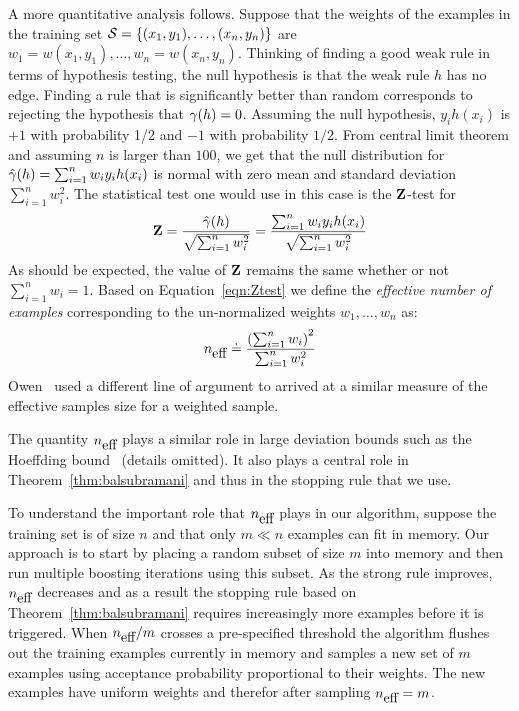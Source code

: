 A more quantitative analysis follows. Suppose that the weights of the
examples in the training set ${\cal S}=\{ (x_1, y_1), \ldots, (x_n,
y_n) \}$ are $w_1=w(x_1,y_1),\ldots,w_n=w(x_n,y_n)$. Thinking of
finding a good weak rule in terms of hypothesis testing, the null
hypothesis is that the weak rule $h$ has no edge. Finding a rule that
is significantly better than random corresponds to rejecting the
hypothesis that $\gamma(h)=0$.  Assuming the null hypothesis, $y_i
h(x_i)$ is $+1$ with probability 1/2 and $-1$ with probability
$1/2$. From central limit theorem and assuming $n$ is larger than
$100$, we get that the null distribution for $\hat{\gamma}(h)=\sum_{i=1}^n
w_i y_i h(x_i)$ is normal with zero mean and standard deviation
$\sum_{i=1}^n w_i^2$. The statistical test one would use in this case
is the ${\mathbf Z}$-test for
\begin{equation} \label{eqn:Ztest}
{\mathbf Z} = \frac{\hat{\gamma}(h)}{\sqrt{\sum_{i=1}^n w_i^2}}
= \frac{\sum_{i=1}^n w_i y_i h(x_i)}{\sqrt{\sum_{i=1}^n w_i^2}}
\end{equation}
As should be expected, the value of ${\mathbf Z}$ remains the same whether
or not $\sum_{i=1}^n w_i=1$. Based on Equation~\ref{eqn:Ztest} we
define the {\em effective number of examples} corresponding to the
un-normalized weights $w_1,\ldots,w_n$ as:
\begin{equation} \label{eqn:neff}
  {n_{\mbox{eff}}} \doteq \frac{\left(\sum_{i=1}^n w_i\right)^2}{\sum_{i=1}^n w_i^2}
\end{equation}
Owen~\cite{owen_monte_2013} used a different line of
argument to arrived at a similar measure of
the effective samples size for a weighted sample.

The quantity ${n_{\mbox{eff}}}$ plays a similar role in large deviation bounds
such as the Hoeffding bound~\cite{hoeffding_probability_1963} (details omitted).
It also plays
a central role in Theorem~\ref{thm:balsubramani} and thus in the
stopping rule that we use.

To understand the important role that ${n_{\mbox{eff}}}$ plays in our algorithm,
suppose the training set is of size $n$ and that only $m \ll n$
examples can fit in memory. Our approach is to start by placing a
random subset of size $m$ into memory and then run multiple
boosting iterations using this subset. As the strong rule improves,
${n_{\mbox{eff}}}$ decreases and as a result the stopping rule based on
Theorem~\ref{thm:balsubramani} requires increasingly more examples
before it is triggered. When ${n_{\mbox{eff}}}/m$ crosses a pre-specified
threshold the algorithm flushes out the training examples currently in
memory and samples a new set of $m$ examples using acceptance
probability proportional to their weights. The new examples have
uniform weights and therefor after sampling ${n_{\mbox{eff}}}=m$.

